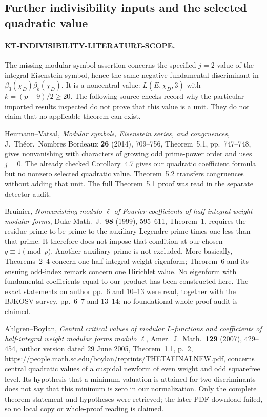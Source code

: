 \subsection{Further indivisibility inputs and the selected quadratic value}

\paragraph{KT-INDIVISIBILITY-LITERATURE-SCOPE.}
The missing modular-symbol assertion concerns the specified
$j=2$ value of the integral Eisenstein symbol, hence the same
negative fundamental discriminant in
$\beta_3(\chi_D)\beta_b(\chi_D)$.
It is a noncentral value: $L(E,\chi_D,3)$ with
$k=(p+9)/2\geq20$.  The following source checks record why
the particular imported results inspected do not prove that
this value is a unit.  They do not claim that no applicable
theorem can exist.

Heumann--Vatsal, \emph{Modular symbols, Eisenstein series,
and congruences}, J.~Th\'eor.~Nombres Bordeaux \textbf{26} (2014),
709--756, Theorem~5.1, pp.~747--748, gives nonvanishing with
characters of growing odd prime-power order and uses $j=0$.
The already checked Corollary~4.7 gives our quadratic
coefficient formula but no nonzero selected quadratic value.
Theorem~5.2 transfers congruences without adding that unit.
The full Theorem~5.1 proof was read in the separate detector
audit.

Bruinier, \emph{Nonvanishing modulo $\ell$ of Fourier
coefficients of half-integral weight modular forms},
Duke Math.~J.~\textbf{98} (1999), 595--611, Theorem~1,
requires the residue prime to be prime to the auxiliary
Legendre prime times one less than that prime.  It therefore
does not impose that condition at our chosen $q\equiv1\pmod p$.
Another auxiliary prime is not excluded.  More basically,
Theorems~2--4 concern one half-integral weight eigenform;
Theorem~6 and its ensuing odd-index remark concern one
Dirichlet value.  No eigenform with fundamental coefficients
equal to our product has been constructed here.  The exact
statements on author pp.~6 and 10--13 were read, together
with the BJKOSV survey, pp.~6--7 and 13--14; no foundational
whole-proof audit is claimed.

Ahlgren--Boylan, \emph{Central critical values of modular
$L$-functions and coefficients of half-integral weight modular
forms modulo $\ell$}, Amer.~J.~Math.~\textbf{129} (2007),
429--454, author version dated 29 June 2005,
Theorem~1.1, p.~2,
\url{https://people.math.sc.edu/boylan/reprints/THETAFINALNEW.pdf},
concerns central quadratic values of a cuspidal newform of
even weight and odd squarefree level.  Its hypothesis that
a minimum valuation is attained for two discriminants does
not say that this minimum is zero in our normalization.
Only the complete theorem statement and hypotheses were
retrieved; the later PDF download failed, so no local copy
or whole-proof reading is claimed.

